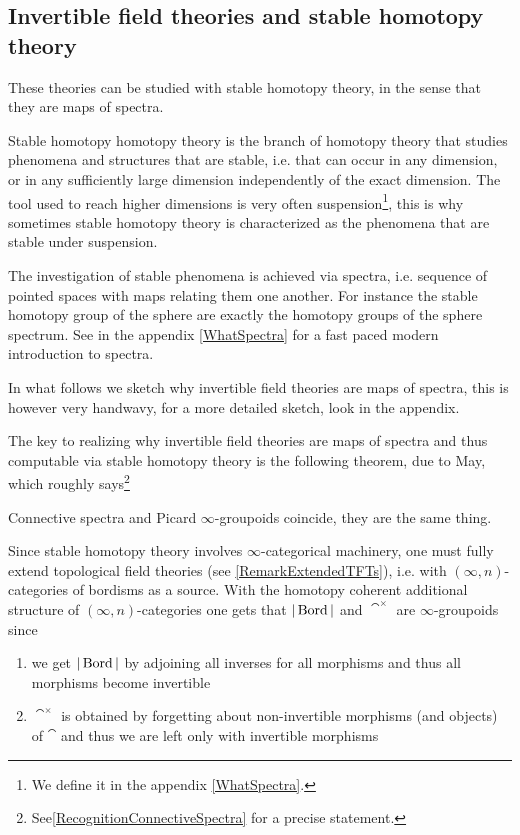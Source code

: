 \subsection{Invertible field theories and stable homotopy theory \extra}\label{Spectra Phases of Matter}

These theories can be studied with stable homotopy theory, in the sense that they are maps of spectra.

 Stable homotopy homotopy theory is the branch
of homotopy theory that studies phenomena and structures that are stable, i.e. that can occur in any 
dimension, or in any sufficiently large dimension independently of the exact dimension. The tool used to
reach higher dimensions is very often suspension\footnote{We define it in the appendix \ref{WhatSpectra}.}, this is 
why sometimes stable homotopy theory is characterized as the phenomena that are stable under
 suspension.

The investigation of stable phenomena is achieved via spectra, i.e. sequence of pointed spaces with maps
relating them one another. For instance the stable homotopy group of the sphere are exactly the
 homotopy groups of the sphere spectrum. See in the appendix \ref{WhatSpectra} for a fast paced 
modern introduction to spectra.

In what follows we sketch why invertible field theories are maps of spectra, this is however very
handwavy, for a more detailed sketch, look in the appendix.

The key to realizing why invertible field theories are maps of spectra
and thus computable via stable homotopy theory is the following theorem, due to May, which roughly
 says\footnote{See\ref{RecognitionConnectiveSpectra} for a precise statement.}
\begin{thm}\label{RecognitionConnective2}
Connective spectra and Picard $\infty$-groupoids coincide, they are the same thing.
\end{thm}
Since stable homotopy theory involves $\infty$-categorical machinery, one must fully extend topological field theories
 (see \ref{RemarkExtendedTFTs}), i.e. with $(\infty,n)$-categories of bordisms as a source.
With the homotopy coherent additional structure of $(\infty,n)$-categories one gets that $|\operatorname{Bord}|$ and
  $\cat^\times$ are $\infty$-groupoids since
\begin{enumerate}
    \item we get $|\operatorname{Bord}|$ by adjoining all inverses for all morphisms and thus all morphisms become invertible
    \item  $\cat^\times$ is obtained by forgetting about non-invertible morphisms (and objects) of $\cat$ and thus we are left only with invertible morphisms
\end{enumerate} 

